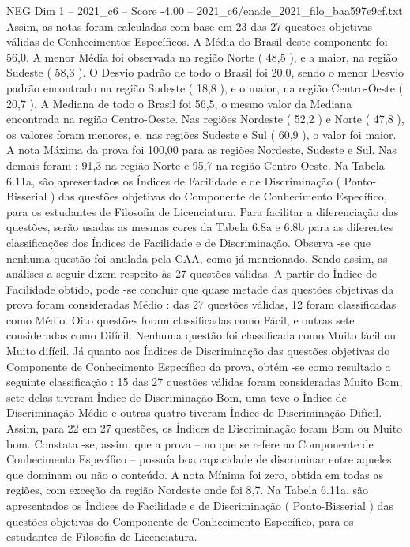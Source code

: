 \begin{textsample}{NEG Dim 1 – 2021\_c6 – Score -4.00 – 2021\_c6/enade\_2021\_filo\_baa597e9cf.txt}
Assim, as notas foram calculadas com base em 23 das 27 questões objetivas válidas de Conhecimentos Específicos.
A Média do Brasil deste componente foi 56,0.
A menor Média foi observada na região Norte ( 48,5 ), e a maior, na região Sudeste ( 58,3 ).
O Desvio padrão de todo o Brasil foi 20,0, sendo o menor Desvio padrão encontrado na região Sudeste ( 18,8 ), e o maior, na região Centro-Oeste ( 20,7 ).
A Mediana de todo o Brasil foi 56,5, o mesmo valor da Mediana encontrada na região Centro-Oeste.
Nas regiões Nordeste ( 52,2 ) e Norte ( 47,8 ), os valores foram menores, e, nas regiões Sudeste e Sul ( 60,9 ), o valor foi maior.
A nota Máxima da prova foi 100,00 para as regiões Nordeste, Sudeste e Sul.
Nas demais foram : 91,3 na região Norte e 95,7 na região Centro-Oeste.
Na Tabela 6.11a, são apresentados os Índices de Facilidade e de Discriminação ( Ponto-Bisserial ) das questões objetivas do Componente de Conhecimento Específico, para os estudantes de Filosofia de Licenciatura.
Para facilitar a diferenciação das questões, serão usadas as mesmas cores da Tabela 6.8a e 6.8b para as diferentes classificações dos Índices de Facilidade e de Discriminação.
Observa -se que nenhuma questão foi anulada pela CAA, como já mencionado.
Sendo assim, as análises a seguir dizem respeito às 27 questões válidas.
A partir do Índice de Facilidade obtido, pode -se concluir que quase metade das questões objetivas da prova foram consideradas Médio : das 27 questões válidas, 12 foram classificadas como Médio.
Oito questões foram classificadas como Fácil, e outras sete consideradas como Difícil.
Nenhuma questão foi classificada como Muito fácil ou Muito difícil.
Já quanto aos Índices de Discriminação das questões objetivas do Componente de Conhecimento Específico da prova, obtém -se como resultado a seguinte classificação : 15 das 27 questões válidas foram consideradas Muito Bom, sete delas tiveram Índice de Discriminação Bom, uma teve o Índice de Discriminação Médio e outras quatro tiveram Índice de Discriminação Difícil.
Assim, para 22 em 27 questões, os Índices de Discriminação foram Bom ou Muito bom.
Constata -se, assim, que a prova – no que se refere ao Componente de Conhecimento Específico – possuía boa capacidade de discriminar entre aqueles que dominam ou não o conteúdo.
A nota Mínima foi zero, obtida em todas as regiões, com exceção da região Nordeste onde foi 8,7.
Na Tabela 6.11a, são apresentados os Índices de Facilidade e de Discriminação ( Ponto-Bisserial ) das questões objetivas do Componente de Conhecimento Específico, para os estudantes de Filosofia de Licenciatura.

\end{textsample}
